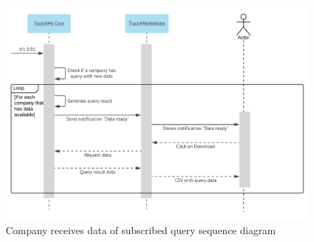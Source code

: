 \begin{figure}[H]
  \includegraphics[width=\textwidth,height=\textheight,keepaspectratio]{assets/sequence/CompanyReceivesDataOfSubscribedQuery.pdf}
  \caption{Company receives data of subscribed query sequence diagram}
  \label{fig:CompanyReceivesDataOfSubscribedQuery}
\end{figure}

















\newpage
